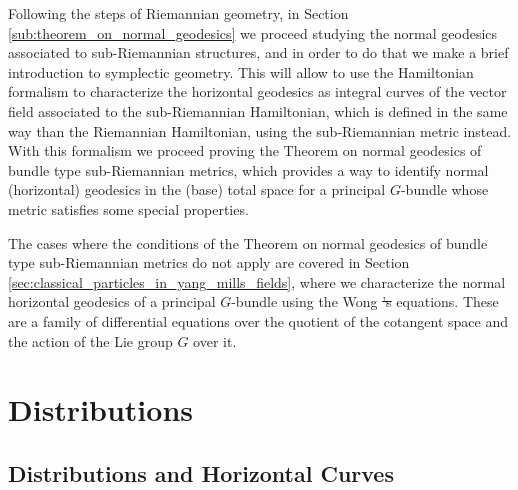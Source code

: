\documentclass[12pt, letterpaper, reqno]{amsart}
\theoremstyle{definition}
\theoremstyle{plain}
\theoremstyle{remark}
\providecommand{\DIFdel}[1]{{\protect\color{red}\sout{#1}}}                      %
\providecommand{\DIFdelbegin}{} %
\providecommand{\DIFdelend}{} %
\newcommand{\DIFscaledelfig}{0.5}
\newlength{\DIFdelgraphicswidth} %
\newlength{\DIFdelgraphicsheight} %
\newcommand{\DIFdelincludegraphics}[2][]{%
\sbox{\DIFdelgraphicsbox}{\DIFOincludegraphics[#1]{#2}}%
\settoboxwidth{\DIFdelgraphicswidth}{\DIFdelgraphicsbox} %
\settoboxtotalheight{\DIFdelgraphicsheight}{\DIFdelgraphicsbox} %
\scalebox{\DIFscaledelfig}{%
\parbox[b]{\DIFdelgraphicswidth}{\usebox{\DIFdelgraphicsbox}\\[-\baselineskip] \rule{\DIFdelgraphicswidth}{0em}}\llap{\resizebox{\DIFdelgraphicswidth}{\DIFdelgraphicsheight}{%
\setlength{\unitlength}{\DIFdelgraphicswidth}%
\begin{picture}(1,1)%
\thicklines\linethickness{2pt} %
{\color[rgb]{1,0,0}\put(0,0){\framebox(1,1){}}}%
{\color[rgb]{1,0,0}\put(0,0){\line( 1,1){1}}}%
{\color[rgb]{1,0,0}\put(0,1){\line(1,-1){1}}}%
\end{picture}%
}\hspace*{3pt}}} %
} %
\DeclareRobustCommand{\DIFdelbegin}{\DIFOdelbegin \let\includegraphics\DIFdelincludegraphics} %
\DeclareRobustCommand{\DIFdelend}{\DIFOaddend \let\includegraphics\DIFOincludegraphics} %
\begin{document}
Following the steps of Riemannian geometry, in Section \ref{sub:theorem_on_normal_geodesics} we proceed studying the normal geodesics associated to sub-Riemannian structures, and in order to do that we make a brief introduction to symplectic geometry. This will allow to use the Hamiltonian formalism to characterize the horizontal geodesics as integral curves of the vector field associated to the sub-Riemannian Hamiltonian, which is defined in the same way than the Riemannian Hamiltonian, using the sub-Riemannian metric instead. With this formalism we proceed proving the Theorem on normal geodesics of bundle type sub-Riemannian metrics, which provides a way to identify normal (horizontal) geodesics in the (base) total space for a principal $ G $-bundle whose metric satisfies some special properties.

The cases where the conditions of the Theorem on normal geodesics of bundle type sub-Riemannian metrics do not apply are covered in Section \ref{sec:classical_particles_in_yang_mills_fields}, where we characterize the normal horizontal geodesics of a principal $ G $-bundle using the Wong \DIFdelbegin \DIFdel{'s }\DIFdelend equations. These are a family of differential equations over the quotient of the cotangent space and the action of the Lie group $ G $ over it.
\section{Distributions}
\label{sec:1}

\subsection{Distributions and Horizontal Curves}%
\label{sub:distributions}
\end{document}
